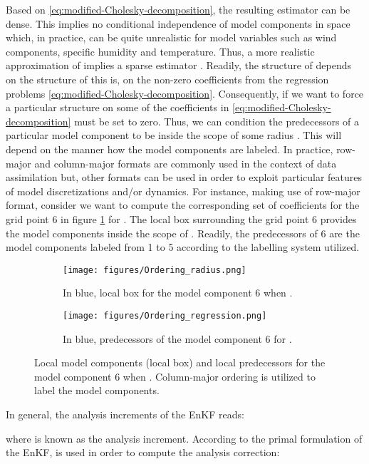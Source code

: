\documentclass[12pt]{article}
\begin{document}
Based on \eqref{eq:modified-Cholesky-decomposition}, the resulting estimator  can be dense. This implies no conditional independence of model components in space which, in practice, can be quite unrealistic for model variables such as wind components, specific humidity and temperature. Thus, a more realistic approximation of  implies a sparse estimator . Readily, the structure of  depends on the structure of  this is, on the non-zero coefficients from the regression problems \eqref{eq:modified-Cholesky-decomposition}. Consequently, if we want to force a particular structure on  some of the coefficients in \eqref{eq:modified-Cholesky-decomposition} must be set to zero. Thus, we can condition the predecessors of a particular model component to be inside the scope of some radius . This will depend on the manner how the model components are labeled. In practice, row-major and column-major formats are commonly used in the context of data assimilation but, other formats can be used in order to exploit particular features of model discretizations and/or dynamics. For instance, making use of row-major format, consider we want to compute the corresponding set of coefficients for the grid point 6 in figure \ref{fig:predecessors} for . The local box surrounding the grid point 6 provides the model components inside the scope of . Readily, the predecessors of 6 are the model components labeled from 1 to 5 according to the labelling system utilized.
\begin{figure}[H]
\centering
\begin{subfigure}{0.4\textwidth}
\centering
\texttt{[image: figures/Ordering\_radius.png]}
\caption{In blue, local box for the model component 6 when .}
\end{subfigure} \hspace{1em}
\begin{subfigure}{0.4\textwidth}
\centering
\texttt{[image: figures/Ordering\_regression.png]}
\caption{In blue, predecessors of the model component 6 for .}
\end{subfigure}
\caption{Local model components (local box) and local predecessors for the model component 6 when . Column-major ordering is utilized to label the model components.}
\label{fig:predecessors}
\end{figure}
In general, the analysis increments of the EnKF reads:

where  is known as the analysis increment. According to the primal formulation of the EnKF,  is used in order to compute the analysis correction:
\end{document}
